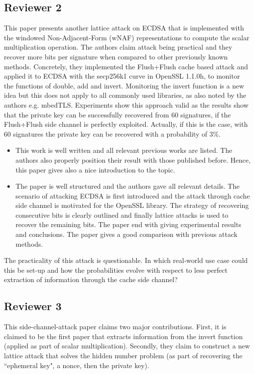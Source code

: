 \subsection{Reviewer 2}
This paper presents another lattice attack on ECDSA that is implemented with the windowed Non-Adjacent-Form (wNAF) representations to compute the scalar multiplication operation. 
The authors claim attack being practical and they recover more bits per signature when compared to other previously known methods.
Concretely, they implemented the Flush+Flush cache based attack and applied it to ECDSA with the secp256k1 curve in OpenSSL 1.1.0h, to monitor the functions of double, add and invert.
Monitoring the invert function is a new idea but this does not apply to all commonly used libraries, as also noted by the authors e.g. mbedTLS.
Experiments show this approach valid as the results show that the private key can be successfully recovered from $60$ signatures, if the Flush+Flush side channel is perfectly exploited.
Actually, if this is the case, with $60$ signatures the private key can be recovered with a probability of $3\%$.

\begin{itemize}
\item This work is well written and all relevant previous works are listed. The authors also properly position their result with those published before. Hence, this paper gives also a nice introduction to the topic.
\item The paper is well structured and the authors gave all relevant details. The scenario of attacking ECDSA is first introduced and the attack through cache side channel is motivated for the OpenSSL library. The strategy of recovering consecutive bits is clearly outlined and finally lattice attacks is used to recover the remaining bits. The paper end with giving experimental results and conclusions. The paper gives a good comparison with previous attack methods.
\end{itemize}

The practicality of this attack is questionable. In which real-world use case could this be set-up and how the probabilities evolve with respect to less perfect extraction of information through the cache side channel?

\subsection{Reviewer 3}
This side-channel-attack paper claims two major contributions. First, it is claimed to be the first paper that extracts information from the invert function (applied as part of scalar multiplication). 
Secondly, they claim to construct a new lattice attack that solves the hidden number problem (as part of recovering the ``ephemeral key", a nonce, then the private key). 

